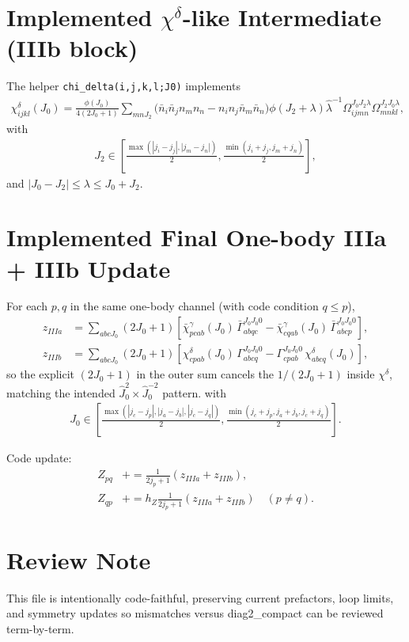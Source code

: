 \documentclass{article}
\begin{document}
\section*{Implemented $\chi^{\delta}$-like Intermediate (IIIb block)}
The helper \texttt{chi\_delta(i,j,k,l;J0)} implements
\begin{align}
\chi^{\delta}_{ijkl}(J_0)
=
\frac{\phi(J_0)}{4(2J_0+1)}
\sum_{mnJ_2}
\Big(\bar n_i\bar n_j n_m n_n - n_i n_j\bar n_m\bar n_n\Big)
\phi(J_2+\lambda)
\hat\lambda^{-1}
\Omega_{ijmn}^{J_0J_2\lambda}
\Omega_{mnkl}^{J_2J_0\lambda},
\end{align}
with
\begin{align}
J_2\in
\left[
\frac{\max(|j_i-j_j|,|j_m-j_n|)}{2},
\frac{\min(j_i+j_j,j_m+j_n)}{2}
\right],
\end{align}
and $|J_0-J_2|\le\lambda\le J_0+J_2$.

\section*{Implemented Final One-body IIIa + IIIb Update}
For each $p,q$ in the same one-body channel (with code condition $q\le p$),
\begin{align}
z_{IIIa} &=
\sum_{abcJ_0}(2J_0+1)
\left[
\bar\chi^{\gamma}_{pcab}(J_0)\,\bar\Gamma_{abqc}^{J_0J_0 0}
-
\bar\chi^{\gamma}_{cqab}(J_0)\,\bar\Gamma_{abcp}^{J_0J_0 0}
\right],
\\
z_{IIIb} &=
\sum_{abcJ_0}(2J_0+1)
\left[
\chi^{\delta}_{cpab}(J_0)\,\Gamma_{abcq}^{J_0J_0 0}
-
\Gamma_{cpab}^{J_0J_0 0}\,\chi^{\delta}_{abcq}(J_0)
\right],
\end{align}
so the explicit $(2J_0+1)$ in the outer sum cancels the
$1/(2J_0+1)$ inside $\chi^{\delta}$, matching the intended
$\hat J_0^2\times\hat J_0^{-2}$ pattern.
with
\begin{align}
J_0\in
\left[
\frac{\max(|j_c-j_p|,|j_a-j_b|,|j_c-j_q|)}{2},
\frac{\min(j_c+j_p,j_a+j_b,j_c+j_q)}{2}
\right].
\end{align}

Code update:
\begin{align}
Z_{pq} &\mathrel{+}= \frac{1}{2j_p+1}(z_{IIIa}+z_{IIIb}), \\
Z_{qp} &\mathrel{+}= h_Z\frac{1}{2j_p+1}(z_{IIIa}+z_{IIIb})\quad (p\ne q).
\end{align}

\section*{Review Note}
This file is intentionally code-faithful, preserving current prefactors,
loop limits, and symmetry updates so mismatches versus diag2\_compact can be
reviewed term-by-term.
\end{document}
